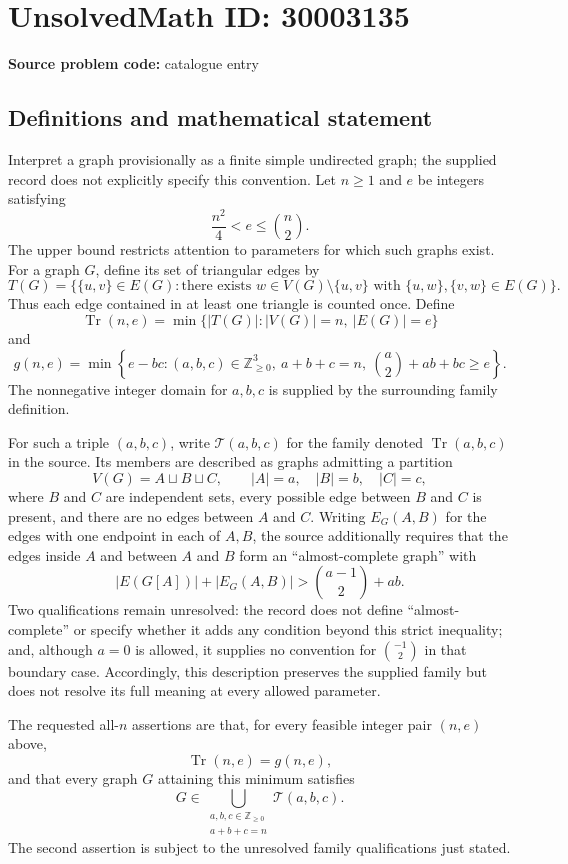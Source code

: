 \documentclass[11pt]{article}
\begin{document}
\section*{UnsolvedMath ID: 30003135}
\textbf{Source problem code:} catalogue entry
\subsection{Definitions and mathematical statement}
Interpret a graph provisionally as a finite simple undirected graph; the supplied record does not explicitly specify this convention. Let \(n\geq 1\) and \(e\) be integers satisfying
\[
\frac{n^2}{4}<e\leq\binom n2.
\]
The upper bound restricts attention to parameters for which such graphs exist. For a graph \(G\), define its set of triangular edges by
\[
T(G)=\bigl\{\{u,v\}\in E(G):\text{there exists }w\in V(G)\setminus\{u,v\}\text{ with }\{u,w\},\{v,w\}\in E(G)\bigr\}.
\]
Thus each edge contained in at least one triangle is counted once. Define
\[
\operatorname{Tr}(n,e)=\min\bigl\{|T(G)|:|V(G)|=n,\ |E(G)|=e\bigr\}
\]
and
\[
g(n,e)=\min\left\{e-bc:(a,b,c)\in\mathbb Z_{\geq0}^{3},\ a+b+c=n,\ \binom a2+ab+bc\geq e\right\}.
\]
The nonnegative integer domain for \(a,b,c\) is supplied by the surrounding family definition.

For such a triple \((a,b,c)\), write \(\mathcal T(a,b,c)\) for the family denoted \(\operatorname{Tr}(a,b,c)\) in the source. Its members are described as graphs admitting a partition
\[
V(G)=A\sqcup B\sqcup C,\qquad |A|=a,\quad |B|=b,\quad |C|=c,
\]
where \(B\) and \(C\) are independent sets, every possible edge between \(B\) and \(C\) is present, and there are no edges between \(A\) and \(C\). Writing \(E_G(A,B)\) for the edges with one endpoint in each of \(A,B\), the source additionally requires that the edges inside \(A\) and between \(A\) and \(B\) form an ``almost-complete graph'' with
\[
|E(G[A])|+|E_G(A,B)|>\binom{a-1}{2}+ab.
\]
Two qualifications remain unresolved: the record does not define ``almost-complete'' or specify whether it adds any condition beyond this strict inequality; and, although \(a=0\) is allowed, it supplies no convention for \(\binom{-1}{2}\) in that boundary case. Accordingly, this description preserves the supplied family but does not resolve its full meaning at every allowed parameter.

The requested all-\(n\) assertions are that, for every feasible integer pair \((n,e)\) above,
\[
\operatorname{Tr}(n,e)=g(n,e),
\]
and that every graph \(G\) attaining this minimum satisfies
\[
G\in\bigcup_{\substack{a,b,c\in\mathbb Z_{\geq0}\\a+b+c=n}}\mathcal T(a,b,c).
\]
The second assertion is subject to the unresolved family qualifications just stated.
\end{document}
